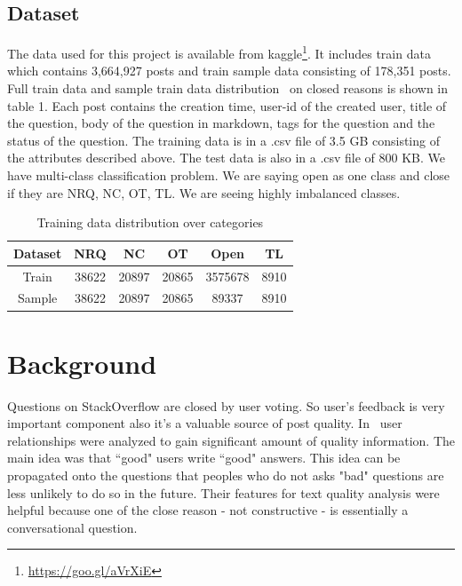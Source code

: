 \documentclass{article} %
\begin{document}
\subsection{Dataset}
The data used for this project is available from kaggle\footnote{\url{https://goo.gl/aVrXiE}}. It includes train data which contains 3,664,927 posts and train sample data consisting of 178,351 posts. Full train data
and sample train data distribution~\cite{lezina2013predict} on closed reasons is shown in table 1. Each post contains the creation time, user-id of the created user, title of the question, body of the question in markdown, tags for the question and the status of the question. The training data is in a .csv file of 3.5 GB consisting of the attributes described above. The test data is also in a .csv file of 800 KB. We have multi-class classification problem. We are saying open as one class and close if they are NRQ, NC, OT, TL. We are seeing highly imbalanced classes.

\begin{table}[!htbp]
\begin{center}
\begin{tabular}{|c|c|c|c|c|c|}        
        \hline
        Dataset & NRQ & NC & OT & Open & TL \\ [0.5ex]
        \hline
        Train & 38622 & 20897 & 20865 & 3575678 & 8910 \\ [0.5ex]
        \hline
        Sample & 38622 & 20897 & 20865 & 89337 & 8910 \\ [0.5ex]
        \hline
\end{tabular}
\end{center}
\caption{Training data distribution over categories}
\label{tb:dataset}
\vspace{-2mm}
\end{table}

\section{Background}
Questions on StackOverflow are closed by user voting. So user's feedback is very important component also it's a valuable source of post quality. In~\cite{agichtein2008finding} user relationships were analyzed to gain significant amount of quality information.  The main idea was that ``good" users write ``good" answers. This idea can be propagated onto the questions that peoples who do not asks "bad" questions are less unlikely to do so in the future. Their features for text quality analysis were helpful because one of the close reason - not constructive - is essentially a conversational question.
\end{document}
